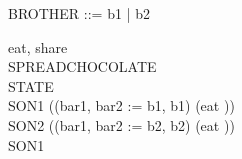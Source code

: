 \begin{zed}
BROTHER ::= b1 | b2
\end{zed}
\begin{circus}
\circchannel eat, share \\%
\circprocess SPREADCHOCOLATE \circdef \circbegin \\
    \circstate STATE  \\
    SON1 \circdef ((bar1, bar2 := b1, b1) \circseq (eat \then \Skip)) \\
    SON2 \circdef ((bar1, bar2 := b2, b2) \circseq (eat \then \Skip)) \\
    \circspot SON1 \\
\circend
\end{circus}
